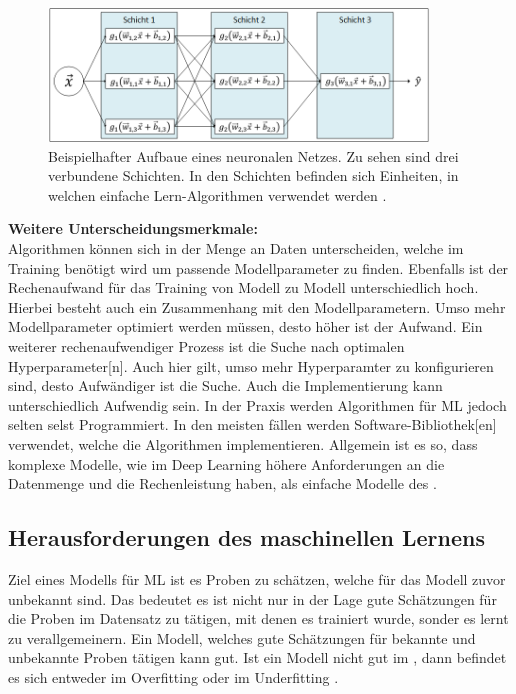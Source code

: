 \begin{figure}[htb]
    \centering
    \includegraphics[width=0.9\textwidth]{img/Grafiken/Aufbau Neuronales Netz.png}
    \caption[Beispielhafter Aufbaue eines neuronalen Netzes.]{Beispielhafter Aufbaue eines neuronalen Netzes. Zu sehen sind drei verbundene Schichten. In den Schichten befinden sich Einheiten, in welchen einfache Lern-Algorithmen verwendet werden \cite{Burkov.2019}.}
    \label{fig:SimpleDL}
\end{figure}

\par
\textbf{Weitere Unterscheidungsmerkmale:}\\
Algorithmen können sich in der Menge an Daten unterscheiden, welche im Training benötigt wird um passende Modellparameter zu finden. Ebenfalls ist der Rechenaufwand für das Training von Modell zu Modell unterschiedlich hoch. Hierbei besteht auch ein Zusammenhang mit den Modellparametern. Umso mehr Modellparameter optimiert werden müssen, desto höher ist der Aufwand. Ein weiterer rechenaufwendiger Prozess ist die Suche nach optimalen \gls{Hyperparameter}[n]. Auch hier gilt, umso mehr Hyperparamter zu konfigurieren sind, desto Aufwändiger ist die Suche. Auch die Implementierung kann unterschiedlich Aufwendig sein. In der Praxis werden Algorithmen für \gls{ML} jedoch selten selst Programmiert. In den meisten fällen werden Software-\gls{Bibliothek}[en] verwendet, welche die Algorithmen implementieren. Allgemein ist es so, dass komplexe Modelle, wie im \gls{Deep Learning} höhere Anforderungen an die Datenmenge und die Rechenleistung haben, als einfache Modelle des  \cite{Burkov.2019, ShalevShwartz.2014}.


\subsection{Herausforderungen des maschinellen Lernens} \label{sec:Herausforderungen ML}
Ziel eines Modells für \gls{ML} ist es Proben zu schätzen, welche für das Modell zuvor unbekannt sind. Das bedeutet es ist nicht nur in der Lage gute Schätzungen für die Proben im Datensatz zu tätigen, mit denen es trainiert wurde, sonder es lernt zu verallgemeinern. Ein Modell, welches gute Schätzungen für bekannte und unbekannte Proben tätigen kann  gut. Ist ein Modell nicht gut im , dann befindet es sich entweder im \gls{Overfitting} oder im \gls{Underfitting} \cite{Burkov.2019}.\dubpar

